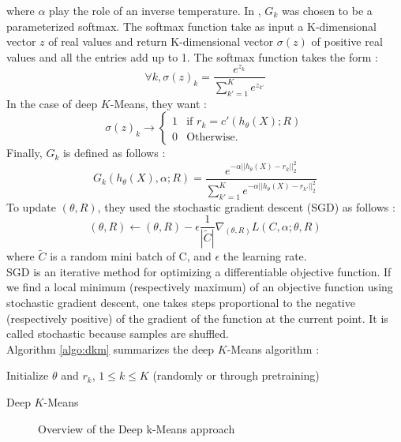 where $\alpha$ play the role of an inverse temperature. In \cite{Deap-K-Means}
, $G_{k}$ was chosen to be a parameterized softmax.
The softmax function take as input a K-dimensional vector $z$ of real values
and return K-dimensional vector $\sigma(z)$ of positive real values and all the 
entries add up to 1. The softmax function takes the form :
\begin{equation}\label{eq:general_softmax}
\forall k, \sigma(z)_k = \frac{e^{z_k}}{\sum_{{k'}=1}^Ke^{z_{k'}}}
\end{equation}
In the case of deep $K$-Means, they want :
\begin{equation}
\sigma(z)_k \rightarrow \left\{
\begin{array}{ll}
  1 & \mbox{if } r_k = c'(h_\theta(X); R)\\
  0 & \mbox{Otherwise.}
\end{array}
\right.
\end{equation}
Finally, $G_{k}$ is defined as follows :
\begin{equation}
G_{k}(h_\theta(X), \alpha; R) = \frac{e^{-\alpha ||h_\theta(X) - r_k||_2^2}}
{\sum\limits_{k' = 1}^K e^{-\alpha ||h_\theta(X) - r_{k'}||_2^2}}
\end{equation}
To update $(\theta, R)$, they used the stochastic gradient descent (SGD)
as follows :
\begin{equation}
  (\theta, R) \gets (\theta, R) - \epsilon \frac{1}{|\widetilde{C}|}
  \nabla_{(\theta, R)} L(C, \alpha; \theta, R)
\end{equation}
where $\widetilde{C}$ is a random mini batch of C, and $\epsilon$ the
learning rate.
\\SGD is an iterative method for optimizing a differentiable objective function.
If we find a local minimum (respectively maximum) of an objective function 
using stochastic gradient descent, one takes steps proportional to the 
negative (respectively positive) of the gradient of the function at the 
current point. It is called stochastic because samples are shuffled.
\\Algorithm \ref{algo:dkm} summarizes the deep $K$-Means algorithm :
\begin{algorithm}[!h]
  Initialize $\theta$ and $r_k$, $1 \leq k \leq K$ (randomly or through 
  pretraining)\\
  \caption{\label{algo:dkm}Deep $K$-Means}
\end{algorithm}
\begin{figure}
  \centering
  \caption{Overview of the Deep k-Means approach}
  \label{fig:approach_dkm}
\end{figure}
